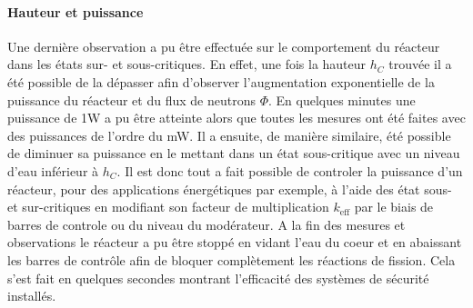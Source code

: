 \paragraph{Hauteur et puissance}
Une dernière observation a pu être effectuée sur le comportement du réacteur dans les états sur- et sous-critiques. En effet, une fois la hauteur $h_C$ trouvée il a été possible de la dépasser afin d'observer l'augmentation exponentielle de la puissance du réacteur et du flux de neutrons $\Phi$. En quelques minutes une puissance de 1W a pu être atteinte alors que toutes les mesures ont été faites avec des puissances de l'ordre du \si{\milli\watt}. Il a ensuite, de manière similaire, été possible de diminuer sa puissance en le mettant dans un état sous-critique avec un niveau d'eau inférieur à $h_C$. Il est donc tout a fait possible de controler la puissance d'un réacteur, pour des applications énergétiques par exemple, à l'aide des état sous- et sur-critiques en modifiant son facteur de multiplication $k_\mathrm{eff}$ par le biais de barres de controle ou du niveau du modérateur. A la fin des mesures et observations le réacteur a pu être stoppé en vidant l'eau du coeur et en abaissant les barres de contrôle afin de bloquer complètement les réactions de fission. Cela s'est fait en quelques secondes montrant l'efficacité des systèmes de sécurité installés.